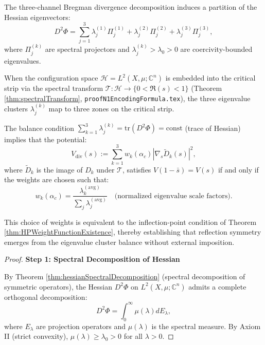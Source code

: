 \begin{theorem}
\begin{lemma}
The three-channel Bregman divergence decomposition induces a partition of the Hessian eigenvectors:
\begin{equation}
D^2\Phi = \sum_{j=1}^3 \lambda_j^{(1)} \Pi_j^{(1)} + \lambda_j^{(2)} \Pi_j^{(2)} + \lambda_j^{(3)} \Pi_j^{(3)},
\end{equation}
where $\Pi_j^{(k)}$ are spectral projectors and $\lambda_j^{(k)} > \lambda_0 > 0$ are coercivity-bounded eigenvalues.

When the configuration space $\mathcal{H} = L^2(X, \mu; \mathbb{C}^n)$ is embedded into the critical strip via the spectral transform $\mathcal{T}: \mathcal{H} \to \{0 < \Re(s) < 1\}$ (Theorem \ref{thm:spectralTransform}, \texttt{proofN1EncodingFormula.tex}), the three eigenvalue clusters $\lambda_j^{(k)}$ map to three zones on the critical strip.

The balance condition $\sum_{k=1}^3 \lambda_j^{(k)} = \mathrm{tr}(D^2\Phi) = \text{const}$ (trace of Hessian) implies that the potential:
\begin{equation}
V_{\mathrm{div}}(s) := \sum_{k=1}^3 w_k(\alpha_c) \left| \nabla_s \tilde{D}_k(s) \right|^2,
\end{equation}
where $\tilde{D}_k$ is the image of $D_k$ under $\mathcal{T}$, satisfies $V(1-\bar{s}) = V(s)$ if and only if the weights are chosen such that:
\begin{equation}
w_k(\alpha_c) = \frac{\lambda_k^{(\text{avg})}}{\sum_j \lambda_j^{(\text{avg})}} \quad \text{(normalized eigenvalue scale factors)}.
\end{equation}

This choice of weights is equivalent to the inflection-point condition of Theorem \ref{thm:HPWeightFunctionExistence}, thereby establishing that reflection symmetry emerges from the eigenvalue cluster balance without external imposition.

\begin{proof}

\textbf{Step 1: Spectral Decomposition of Hessian}

By Theorem \ref{thm:hessianSpectralDecomposition} (spectral decomposition of symmetric operators), the Hessian $D^2\Phi$ on $L^2(X, \mu; \mathbb{C}^n)$ admits a complete orthogonal decomposition:
\begin{equation}
D^2\Phi = \int_0^\infty \mu(\lambda) dE_\lambda,
\end{equation}
where $E_\lambda$ are projection operators and $\mu(\lambda)$ is the spectral measure. By Axiom II (strict convexity), $\mu(\lambda) \geq \lambda_0 > 0$ for all $\lambda > 0$.


\end{proof}
\end{lemma}
\end{theorem}
